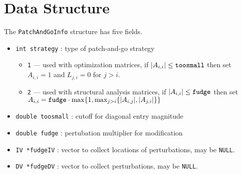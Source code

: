 \par
\section{Data Structure}
\label{section:PatchAndGoInfo:dataStructure}
\par
\par
The {\tt PatchAndGoInfo} structure has five fields.
\begin{itemize}
\item
{\tt int strategy} : type of patch-and-go strategy
\begin{itemize}
\item {\tt 1} --- used with optimization matrices,
if $|A_{i,i}| \le \mbox{\tt toosmall}$ then set
$A_{i,i} = 1$ and $L_{j,i} = 0$ for $j > i$.
\item {\tt 2} --- used with structural analysis matrices,
if $|A_{i,i}| \le \mbox{\tt fudge}$ then
set $A_{i,i} = \mbox{\tt fudge} \cdot
\max\{1, \max_{j>i}\{ |A_{i,j}|, |A_{j,i}| \} \}$
\end{itemize}
\item
{\tt double toosmall} : cutoff for diagonal entry magnitude
\item
{\tt double fudge} : pertubation multiplier for modification
\item
{\tt IV *fudgeIV} : vector to collect locations of perturbations,
may be {\tt NULL}.
\item
{\tt DV *fudgeDV} : vector to collect perturbations,
may be {\tt NULL}.
\end{itemize}

